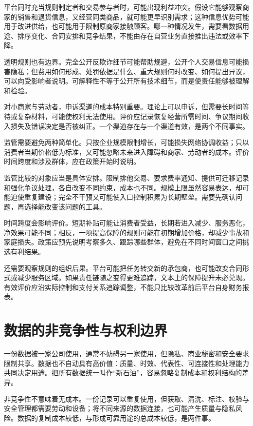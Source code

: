 \documentclass[UTF8,fontset=fandol,zihao=-4,oneside,openany]{ctexbook}
\begin{document}
\label{arg:P185}
平台同时充当规则制定者和交易参与者时，可能出现利益冲突。假设它能够观察商家的销售和退货信息，又经营同类商品，就可能更早识别需求；这种信息优势可能用于改进供给，也可能用于限制原商家接触顾客。哪一种情况发生，需要看数据用途、排序变化、合同安排和竞争结果，不能由存在自营业务直接推出违法或效率下降。

透明规则也有边界。完全公开反欺诈细节可能帮助规避，公开个人交易信息可能损害隐私；但费用如何形成、处罚依据是什么、重大规则何时改变、如何提出异议，可以向受影响者说明。可解释性不等于公开所有技术细节，而是使责任能够被理解和检验。

对小商家与劳动者，申诉渠道的成本特别重要。理论上可以申诉，但需要长时间等待或复杂材料，可能使权利无法使用。评价应记录恢复经营所需时间、争议期间收入损失及错误决定是否被纠正。一个渠道存在与一个渠道有效，是两个不同事实。

监管需要避免两种简单化。只按企业规模限制增长，可能损失网络协调收益；只以消费者当期价格低为标准，又可能忽略未来进入障碍和商家、劳动者的成本。评价时间跨度和涉及群体，应在政策开始时说明。

\label{arg:P186}
监管比较的对象应当是具体安排。限制排他交易、要求费率通知、提供可迁移记录和强化争议处理，各自改变不同约束，成本也不同。规模上限虽然容易表达，却可能迫使重复建设；完全不干预又可能使入口控制积累为长期壁垒。需要先确认问题，再选择能改变该问题的工具。

时间跨度会影响评价。短期补贴可能让消费者受益，长期若进入减少、服务恶化，净效果可能不同；相反，一项提高保障的规则可能在初期增加价格，却减少事故和家庭损失。政策应预先说明考察多久、跟踪哪些群体，避免在不同时间窗口之间挑选有利结果。

还需要观察规则的组织后果。平台可能把任务转交新的承包商，也可能改变合同形式或减少服务区域。如果责任链随之变得更难追踪，文本上的保障提升未必兑现。有效评价应沿实际控制和支付关系追踪调整，不能只比较改革前后平台自身财务报表。

\section{数据的非竞争性与权利边界}
一份数据被一家公司使用，通常不妨碍另一家使用，但隐私、商业秘密和安全要求限制共享。数据也不自动具有高价值：质量、时效、代表性、可连接性和处理能力共同决定用途。把所有数据统一叫作“新石油”，容易忽略复制成本和权利结构的差异。

\label{arg:P187}
非竞争性不意味着无成本。一份记录可以重复使用，但获取、清洗、标注、校验与安全管理都需要劳动和设备；将不同来源的数据连接，也可能产生质量与隐私风险。数据的复制成本较低，与形成可靠用途的总成本较低，是两件事。
\end{document}
